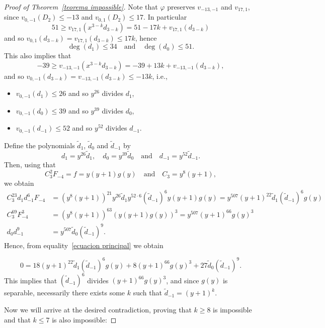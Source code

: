 \documentclass[reqno,a4paper,twoside]{amsart}
\theoremstyle{definition}
\theoremstyle{remark}
\begin{document}
\begin{proof}[Proof of Theorem~\ref{teorema impossible}]
Note that $\varphi$ preserves $v_{-13,-1}$ and $v_{17,1}$, since $v_{0,-1}(D_2)\le -13$ and $v_{0,1}(D_2)\le 17$. In particular
$$
51\ge v_{17,1}(x^{3-k}d_{3-k})=51-17k +v_{17,1}(d_{3-k})
$$
 and so $v_{0,1}(d_{3-k})=v_{17,1}(d_{3-k})\le 17k$, hence
\begin{equation}\label{cota para el grado de los d}
  \deg(d_1)\le 34\quad\text{and}\quad  \deg(d_0)\le 51.
\end{equation}
This also implies that
$$
-39\ge v_{-13,-1}(x^{3-k} d_{3-k})=-39+13k+v_{-13,-1}( d_{3-k}),
$$
and so $v_{0,-1}( d_{3-k})=v_{-13,-1}( d_{3-k})\le -13k$, i.e.,
\begin{itemize}
  \item $v_{0,-1}( d_1)\le 26$ and so $y^{26}$ divides $d_1$,
  \item $v_{0,-1}( d_0)\le 39$ and so $y^{39}$ divides $d_0$,
  \item $v_{0,-1}( d_{-1})\le 52$ and so $y^{52}$ divides $d_{-1}$.
\end{itemize}
Define the polynomials $\tilde d_1$, $\tilde d_0$ and $\tilde d_{-1}$ by
$$
d_1=y^{26}\tilde d_1,\quad d_0=y^{39}\tilde d_0\quad\text{and}\quad d_{-1}=y^{52}\tilde d_{-1}.
$$
Then, using that
$$
C_3^2 F_{-4}=f=y(y+1)g(y)\quad\text{and}\quad C_3=y^8(y+1),
$$
we obtain
\begin{align*}
  C_3^{23} d_1 d_{-1}^6 F_{-4} & =(y^8(y+1))^{21} y^{26}\tilde d_1 y^{52\cdot 6}(\tilde d_{-1})^6 y(y+1)g(y)=y^{507}(y+1)^{22}\tilde d_1 (\tilde d_{-1})^6 g(y) \\
  C_3^{69} F_{-4}^3 & = (y^8(y+1))^{63}(y(y+1)g(y))^3=y^{507}(y+1)^{66}g(y)^3\\
  d_0 d_{-1}^9&= y^{507} \tilde d_0 (\tilde d_{-1})^9.
\end{align*}
Hence, from equality~\eqref{ecuacion principal} we obtain

\begin{equation}\label{nueva ecuacion principal}
  0=18 (y+1)^{22}\tilde d_1 (\tilde d_{-1})^6 g(y)+8 (y+1)^{66}g(y)^3+ 27 \tilde d_0 (\tilde d_{-1})^9.
\end{equation}
This implies that $(\tilde d_{-1})^6$ divides $(y+1)^{66}g(y)^3$, and since $g(y)$ is separable, necessarily there exists some $k$ such that $\tilde d_{-1}=(y+1)^k$.

Now we will arrive at the desired contradiction, proving that $k\ge 8$ is impossible and that $k\le 7$ is also impossible:


\end{proof}
\end{document}
